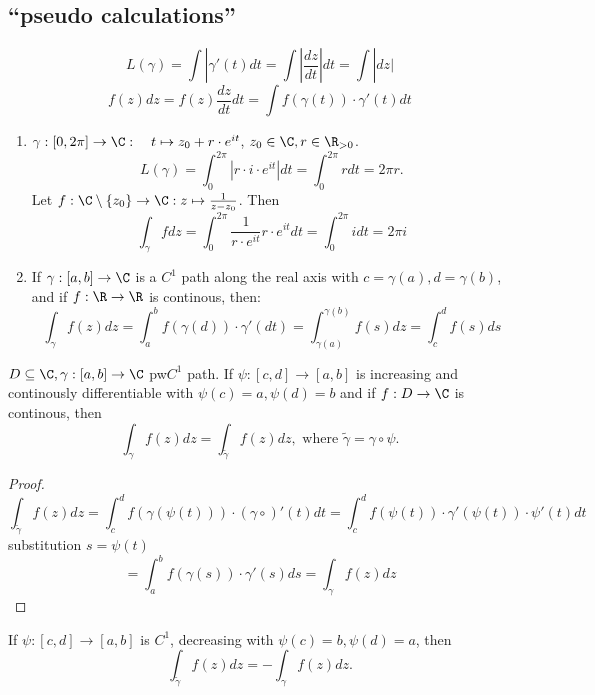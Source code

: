 \subsection*{``pseudo calculations''}
$$L(\gamma)=\int |\gamma'(t)dt=\int |\frac{dz}{dt}|dt=\int |dz|$$
$$f(z)dz=f(z)\frac{dz}{dt}dt=\int f(\gamma(t))\cdot \gamma'(t)dt$$
\begin{example}
  \begin{enumerate}
    \item $\gamma:[0,2\pi]\to \C: \quad t\mapsto z_0+r\cdot e^{it}$, $z_0\in \C, r\in \R_{> 0}$.
    $$L(\gamma)=\int_0^{2\pi}|r\cdot i \cdot e^{it}|dt=\int_0^{2\pi}r dt =2\pi r.$$
    Let $f:\C\setminus \{z_0\}\to \C: z\mapsto \frac{1}{z-z_0}$. Then
      $$\int_\gamma fdz=\int_0^{2\pi}\frac{1}{r\cdot e^{it}}r\cdot e^{it}dt=\int_0^{2\pi}idt=2\pi i$$
    \item If $\gamma:[a,b]\to \C$ is a $C^1$ path along the real axis with $c=\gamma(a), d=\gamma(b)$, and if $f:\R\to\R$ is continous, then:
      $$\int_\gamma f(z)dz=\int_a^bf(\gamma(d))\cdot \gamma'(dt)=\int_{\gamma(a)}^{\gamma(b)}f(s)dz=\int_c^df(s)ds$$
  \end{enumerate}
\end{example}

\begin{remark}
  $D\subseteq \C, \gamma:[a,b]\to\C$ pw$C^1$ path.
    If $\psi:[c,d]\to [a,b]$ is increasing and continously differentiable with $\psi(c)=a, \psi(d)=b$ and if $f:D\to \C$ is continous, then
      $$\int_\gamma f(z)dz=\int_{\tilde{\gamma}}f(z)dz, \text{ where }\tilde{\gamma}=\gamma\circ\psi.$$
\end{remark}
\begin{proof}
  $$\int_{\tilde{\gamma}}f(z)dz=\int_c^d f(\gamma(\psi(t)))\cdot (\gamma\circ)'(t)dt=\int_c^d f(\psi(t))\cdot \gamma'(\psi(t))\cdot\psi'(t)dt$$
  substitution $s=\psi(t)$
  $$=\int_a^bf(\gamma(s))\cdot \gamma'(s)ds=\int_\gamma f(z)dz$$
  \qedhere
\end{proof}
\begin{remark}
  If $\psi:[c,d]\to [a,b]$ is $C^1$, decreasing with $\psi(c)=b, \psi(d)=a$, then
    $$\int_{\tilde{\gamma}}f(z)dz=-\int_\gamma f(z)dz.$$
\end{remark}

